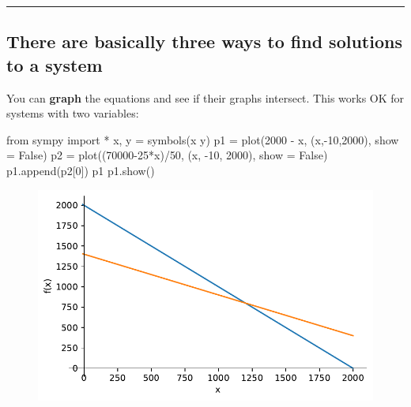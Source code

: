 \documentclass[
  letterpaper,
  DIV=11,
  numbers=noendperiod]{scrartcl}
\newenvironment{Shaded}{\begin{snugshade}}{\end{snugshade}}
\newcommand{\DecValTok}[1]{\textcolor[rgb]{0.68,0.00,0.00}{#1}}
\newcommand{\ImportTok}[1]{\textcolor[rgb]{0.00,0.46,0.62}{#1}}
\newcommand{\NormalTok}[1]{\textcolor[rgb]{0.00,0.23,0.31}{#1}}
\newcommand{\OperatorTok}[1]{\textcolor[rgb]{0.37,0.37,0.37}{#1}}
\newcommand{\StringTok}[1]{\textcolor[rgb]{0.13,0.47,0.30}{#1}}
\newcommand{\VariableTok}[1]{\textcolor[rgb]{0.07,0.07,0.07}{#1}}
\begin{document}
\begin{center}\rule{0.5\linewidth}{0.5pt}\end{center}

\hypertarget{there-are-basically-three-ways-to-find-solutions-to-a-system}{%
\subsection{There are basically three ways to find solutions to a
system}\label{there-are-basically-three-ways-to-find-solutions-to-a-system}}

You can \textbf{graph} the equations and see if their graphs intersect.
This works OK for systems with two variables:

\begin{Shaded}
\begin{Highlighting}[]
\ImportTok{from}\NormalTok{ sympy }\ImportTok{import} \OperatorTok{*}
\NormalTok{x, y }\OperatorTok{=}\NormalTok{ symbols(}\StringTok{\textquotesingle{}x y\textquotesingle{}}\NormalTok{)}
\NormalTok{p1 }\OperatorTok{=}\NormalTok{ plot(}\DecValTok{2000} \OperatorTok{{-}}\NormalTok{ x, (x,}\OperatorTok{{-}}\DecValTok{10}\NormalTok{,}\DecValTok{2000}\NormalTok{), show }\OperatorTok{=} \VariableTok{False}\NormalTok{)}
\NormalTok{p2 }\OperatorTok{=}\NormalTok{ plot((}\DecValTok{70000}\OperatorTok{{-}}\DecValTok{25}\OperatorTok{*}\NormalTok{x)}\OperatorTok{/}\DecValTok{50}\NormalTok{, (x, }\OperatorTok{{-}}\DecValTok{10}\NormalTok{, }\DecValTok{2000}\NormalTok{), show }\OperatorTok{=} \VariableTok{False}\NormalTok{)}
\NormalTok{p1.append(p2[}\DecValTok{0}\NormalTok{])}
\NormalTok{p1}
\NormalTok{p1.show()}
\end{Highlighting}
\end{Shaded}

\begin{figure}[H]

{\centering \includegraphics{302-linearsystems_files/figure-pdf/cell-2-output-1.pdf}

}

\end{figure}
\end{document}
